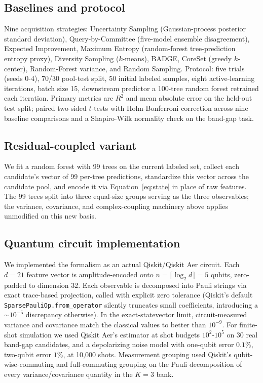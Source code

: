 \documentclass[10pt]{article}
\begin{document}
\subsection{Baselines and protocol}\label{sec:methods-protocol}

Nine acquisition strategies: Uncertainty Sampling (Gaussian-process posterior standard deviation), Query-by-Committee (five-model ensemble disagreement), Expected Improvement, Maximum Entropy (random-forest tree-prediction entropy proxy), Diversity Sampling ($k$-means), BADGE, CoreSet (greedy $k$-center), Random-Forest variance, and Random Sampling. Protocol: five trials (seeds 0-4), 70/30 pool-test split, 50 initial labeled samples, eight active-learning iterations, batch size 15, downstream predictor a 100-tree random forest retrained each iteration. Primary metrics are $R^2$ and mean absolute error on the held-out test split; paired two-sided $t$-tests with Holm-Bonferroni correction across nine baseline comparisons and a Shapiro-Wilk normality check on the band-gap task.

\subsection{Residual-coupled variant}\label{sec:methods-v3}

We fit a random forest with 99 trees on the current labeled set, collect each candidate's vector of 99 per-tree predictions, standardize this vector across the candidate pool, and encode it via Equation~\ref{eq:state} in place of raw features. The 99 trees split into three equal-size groups serving as the three observables; the variance, covariance, and complex-coupling machinery above applies unmodified on this new basis.

\subsection{Quantum circuit implementation}\label{sec:methods-circuit}

We implemented the formalism as an actual Qiskit/Qiskit Aer circuit. Each $d=21$ feature vector is amplitude-encoded onto $n=\lceil\log_2 d\rceil=5$ qubits, zero-padded to dimension 32. Each observable is decomposed into Pauli strings via exact trace-based projection, called with explicit zero tolerance (Qiskit's default \texttt{SparsePauliOp.from\_operator} silently truncates small coefficients, introducing a $\sim10^{-5}$ discrepancy otherwise). In the exact-statevector limit, circuit-measured variance and covariance match the classical values to better than $10^{-9}$. For finite-shot simulation we used Qiskit Aer's estimator at shot budgets $10^2$-$10^5$ on 30 real band-gap candidates, and a depolarizing noise model with one-qubit error $0.1\%$, two-qubit error $1\%$, at 10,000 shots. Measurement grouping used Qiskit's qubit-wise-commuting and full-commuting grouping on the Pauli decomposition of every variance/covariance quantity in the $K=3$ bank.
\end{document}
